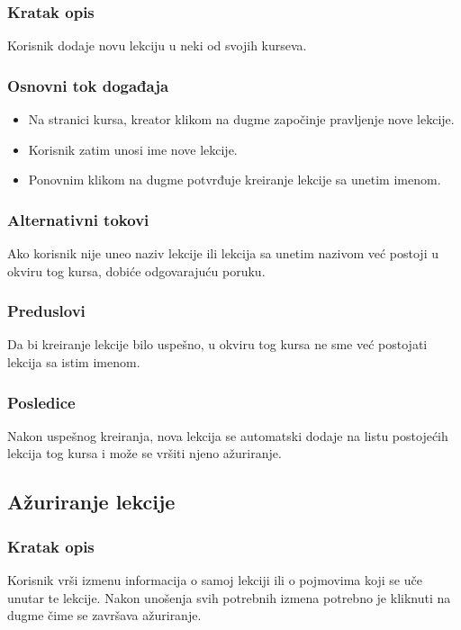 \subsubsection{Kratak opis}
Korisnik dodaje novu lekciju u neki od svojih kurseva.

\subsubsection{Osnovni tok događaja}
\begin{itemize}
  \item Na stranici kursa, kreator klikom na dugme \PlusButton{} započinje pravljenje nove lekcije.
  \item Korisnik zatim unosi ime nove lekcije.
  \item Ponovnim klikom na dugme \PlusButton{} potvrđuje kreiranje lekcije sa unetim imenom.
\end{itemize}
\subsubsection{Alternativni tokovi}
Ako korisnik nije uneo naziv lekcije ili lekcija sa unetim nazivom već postoji u okviru tog kursa, dobiće odgovarajuću poruku.
\subsubsection{Preduslovi}
Da bi kreiranje lekcije bilo uspešno, u okviru tog kursa ne sme već postojati lekcija sa istim imenom.
\subsubsection{Posledice}
Nakon uspešnog kreiranja, nova lekcija se automatski dodaje na listu postojećih lekcija tog kursa i može se vršiti njeno ažuriranje.


\subsection{Ažuriranje lekcije}
\label{subsec:azuriranje-lekcije}

\subsubsection{Kratak opis}
Korisnik vrši izmenu informacija o samoj lekciji ili o pojmovima koji se uče unutar te lekcije.
Nakon unošenja svih potrebnih izmena potrebno je kliknuti na dugme \SaveButton{} čime se završava ažuriranje.

